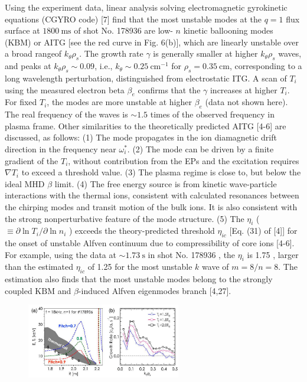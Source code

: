 \documentclass[oneside,onecolumn]{article}
\begin{document}
\begin{sloppypar}
 Using the experiment data, linear analysis solving electromagnetic gyrokinetic equations (CGYRO code) [7] find that the most unstable modes at the $q=1$ flux surface at $1800 \mathrm{~ms}$ of shot No. 178936 are low- $n$ kinetic ballooning modes (KBM) or AITG [see the red curve in Fig. 6(b)], which are linearly unstable over a broad rangeof $k_{\theta} \rho_{s}$. The growth rate $\gamma$ is generally smaller at higher $k_{\theta} \rho_{s}$ waves, and peaks at $k_{\theta} \rho_{s} \sim 0.09$, i.e., $k_{\theta} \sim 0.25 \mathrm{~cm}^{-1}$ for $\rho_{s}=0.35 \mathrm{~cm}$, corresponding to a long wavelength perturbation, distinguished from electrostatic ITG. A scan of $T_{i}$ using the measured electron beta $\beta_{e}$ confirms that the $\gamma$ increases at higher $T_{i}$. For fixed $T_{i}$, the modes are more unstable at higher $\beta_{e}$ (data not shown here). The real frequency of the waves is $\sim 1.5$ times of the observed frequency in plasma frame. Other similarities to the theoretically predicted AITG [4-6] are discussed, as follows: (1) The mode propagates in the ion diamagnetic drift direction in the frequency near $\omega_{i}^{*}$. (2) The mode can be driven by a finite gradient of the $T_{i}$, without contribution from the EPs and the excitation requires $\nabla T_{i}$ to exceed a threshold value. (3) The plasma regime is close to, but below the ideal MHD $\beta$ limit. (4) The free energy source is from kinetic wave-particle interactions with the thermal ions, consistent with calculated resonances between the chirping modes and transit motion of the bulk ions. It is also consistent with the strong nonperturbative feature of the mode structure. (5) The $\eta_{i}$ ( $\equiv \partial \ln T_{i} / \partial \ln n_{i}$ ) exceeds the theory-predicted threshold $\eta_{i c}$ [Eq. (31) of [4]] for the onset of unstable Alfven continuum due to compressibility of core ions [4-6]. For example, using the data at $\sim 1.73 \mathrm{~s}$ in shot No. 178936 , the $\eta_{i}$ is 1.75 , larger than the estimated $\eta_{i c}$ of 1.25 for the most unstable $k$ wave of $m=8 / n=8$. The estimation also finds that the most unstable modes belong to the strongly coupled $\mathrm{KBM}$ and $\beta$-induced Alfven eigenmodes branch [4,27].
 \begin{figure}[htbp]
 	\centering
 	\includegraphics[max width=0.6\textwidth,max height=1.0\textheight]{2023_06_19_f8dbb752866ca158c73eg-5}

\end{figure}
\end{sloppypar}
\end{document}
